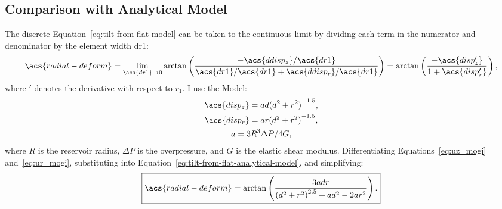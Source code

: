 \subsection{Comparison with Analytical Model}
The discrete Equation~\eqref{eq:tilt-from-flat-model} can be taken to the continuous limit by dividing each term in the numerator and denominator by the element width \acs{dr1}:
\begin{equation}
\acs{radial-deform}
    = \lim_{\acs{dr1}\to0} 
    \arctan\left(\dfrac{-\acs{ddisp_z}/\acs{dr1}}{\acs{dr1}/\acs{dr1}
    + \acs{ddisp_r}/\acs{dr1}}\right) = 
    \arctan\left(\dfrac{-\acs{disp_z'}}{1+\acs{disp_r'}}\right),\label{eq:tilt-from-flat-analytical-model}
\end{equation}
where $'$ denotes the derivative with respect to $r_1$. I use the \textcite{mogi_relations_1958} Model:
\begin{gather}
    \acs{disp_z} = ad{(d^2+r^2)}^{-1.5},\label{eq:uz_mogi}\\
    \acs{disp_r} = ar{(d^2+r^2)}^{-1.5},\label{eq:ur_mogi}\\
    a = {3R^3\Delta P}/{4G},\nonumber
\end{gather}
where $R$ is the reservoir radius, $\Delta P$ is the overpressure, and $G$ is the elastic shear modulus. Differentiating Equations~\eqref{eq:uz_mogi} and~\eqref{eq:ur_mogi}, substituting into Equation~\eqref{eq:tilt-from-flat-analytical-model}, and simplifying:
\begin{equation}
    \boxed{\acs{radial-deform} = \arctan\left(\frac{3adr}{{(d^2+r^2)}^{2.5}+ad^2-2ar^2}\right).}\label{eq:tilt-from-mogi-model}
\end{equation}

